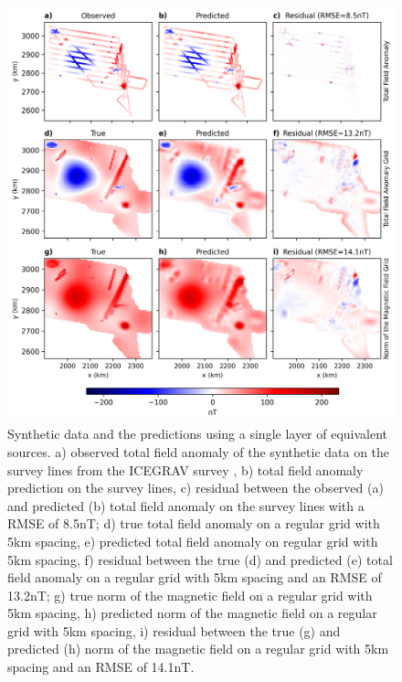 \begin{figure}[!h]
\centering
\includegraphics[width=1\linewidth]{figures/single_layer_synthetic.png}
\caption{
    Synthetic data and the predictions using a single layer of equivalent sources. a) observed total field anomaly of the synthetic data on the survey lines from the ICEGRAV survey \citep{ICEGRAV_data}, b) total field anomaly prediction on the survey lines, c) residual between the observed (a) and predicted (b) total field anomaly on the survey lines with a RMSE of 8.5nT; d) true total field anomaly on a regular grid with 5km spacing, e) predicted total field anomaly on regular grid with 5km spacing, f) residual between the true (d) and predicted (e) total field anomaly on a regular grid with 5km spacing and an RMSE of 13.2nT; g) true norm of the magnetic field on a regular grid with 5km spacing, h) predicted norm of the magnetic field on a regular grid with 5km spacing, i) residual between the true (g) and predicted (h) norm of the magnetic field on a regular grid with 5km spacing and an RMSE of 14.1nT.
}
\label{fig:single_layer_synthetic}
\end{figure}

